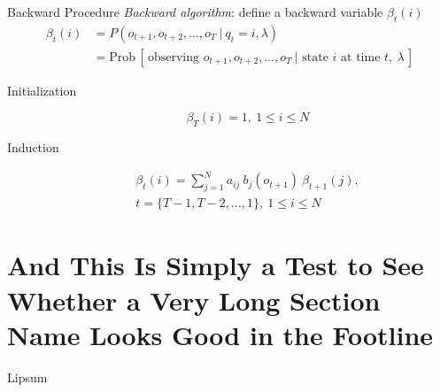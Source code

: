\documentclass[10pt]{beamer}
\begin{document}
\begin{frame}{Backward Procedure}
  \textit{Backward algorithm}: define a backward variable $\beta_t(i)$
  \begin{align}
    \beta_t(i)
    &= P(o_{t+1}, o_{t+2}, \dots, o_T\ |\ q_t = i, \lambda) \\
    &= \text{Prob}\,[\,\text{observing } o_{t+1}, o_{t+2}, \dots, o_T\ | \text{ state } i \text{ at time } t,\ \lambda\,]
  \end{align}
  
  \begin{description}
    \item[Initialization]
    \begin{equation}
      \beta_T(i) = 1,\ 1 \leq i \leq N
    \end{equation}
    \item[Induction]
    \begin{multline}
      \beta_{t}(i) = \sum_{j=1}^{N} a_{i j}\ b_j (o_{t+1})\  \beta_{t+1}(j),\\
      t = \{ T-1, T-2, \dots, 1\},\ 1 \leq i \leq N
    \end{multline}
  \end{description}
\end{frame}

\section{And This Is Simply a Test to See Whether a Very Long Section Name Looks Good in the Footline}

\begin{frame}{Lipsum}
  \lipsum[1]
\end{frame}
\end{document}
